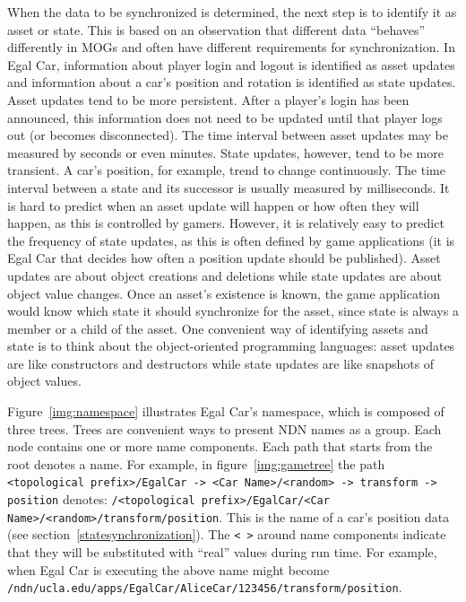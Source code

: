 \documentclass{article}
\begin{document}
When the data to be synchronized is determined, the next step is to identify it as asset or state. This is based on an observation that different data ``behaves'' differently in MOGs and often have different requirements for synchronization. In Egal Car, information about player login and logout is identified as asset updates and information about a car's position and rotation is identified as state updates. Asset updates tend to be more persistent. After a player's login has been announced, this information does not need to be updated until that player logs out (or becomes disconnected). The time interval between asset updates may be measured by seconds or even minutes. State updates, however, tend to be more transient. A car's position, for example, trend to change continuously. The time interval between a state and its successor is usually measured by milliseconds. It is hard to predict when an asset update will happen or how often they will happen, as this is controlled by gamers. However, it is relatively easy to predict the frequency of state updates, as this is often defined by game applications (it is Egal Car that decides how often a position update should be published). Asset updates are about object creations and deletions while state updates are about object value changes. Once an asset's existence is known, the game application would know which state it should synchronize for the asset, since state is always a member or a child of the asset. One convenient way of identifying assets and state is to think about the object-oriented programming languages: asset updates are like constructors and destructors while state updates are like snapshots of object values.

Figure~\ref{img:namespace} illustrates Egal Car's namespace, which is composed of three trees. Trees are convenient ways to present NDN names as a group. Each node contains one or more name components. Each path that starts from the root denotes a name. For example, in figure~\ref{img:gametree} the path \texttt{<topological prefix>/EgalCar -> <Car Name>/<random> -> transform -> position} denotes: \texttt{/<topological prefix>/EgalCar/<Car Name>/<random>/transform/position}. This is the name of a car's position data (see section~\ref{statesynchronization}). The \texttt{< >} around name components indicate that they will be substituted with ``real'' values during run time. For example, when Egal Car is executing the above name might become \texttt{/ndn/ucla.edu/apps/EgalCar/AliceCar/123456/transform/position}.
\end{document}
